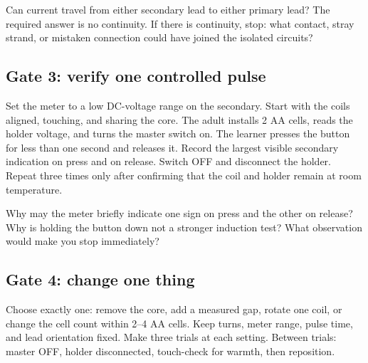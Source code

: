 {\begin{predict}
Can current travel from either secondary lead to either primary lead? The
required answer is no continuity. If there is continuity, stop: what contact,
stray strand, or mistaken connection could have joined the isolated circuits?
\end{predict}

\acceptancetable

\subsection{Gate 3: verify one controlled pulse}
\pulseplate
Set the meter to a low DC-voltage range on the secondary. Start with the coils
aligned, touching, and sharing the core. The adult installs 2 AA cells, reads
the holder voltage, and turns the master switch on. The learner presses the
button for less than one second and releases it. Record the largest visible
secondary indication on press and on release. Switch OFF and disconnect the
holder. Repeat three times only after confirming that the coil and holder
remain at room temperature.

\begin{predict}
Why may the meter briefly indicate one sign on press and the other on release?
Why is holding the button down not a stronger induction test? What observation
would make you stop immediately?
\end{predict}

\subsection{Gate 4: change one thing}
Choose exactly one: remove the core, add a measured gap, rotate one coil, or
change the cell count within 2--4 AA cells. Keep turns, meter range, pulse time,
and lead orientation fixed. Make three trials at each setting. Between trials:
master OFF, holder disconnected, touch-check for warmth, then reposition.

}
